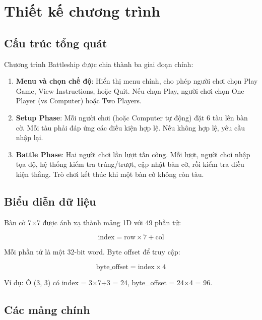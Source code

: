 \section{Thiết kế chương trình}

\subsection{Cấu trúc tổng quát}

Chương trình Battleship được chia thành ba giai đoạn chính:

\begin{enumerate}
    \item \textbf{Menu và chọn chế độ}: Hiển thị menu chính, cho phép người chơi chọn Play Game, View Instructions, hoặc Quit. Nếu chọn Play, người chơi chọn One Player (vs Computer) hoặc Two Players.
    
    \item \textbf{Setup Phase}: Mỗi người chơi (hoặc Computer tự động) đặt 6 tàu lên bàn cờ. Mỗi tàu phải đáp ứng các điều kiện hợp lệ. Nếu không hợp lệ, yêu cầu nhập lại.
    
    \item \textbf{Battle Phase}: Hai người chơi lần lượt tấn công. Mỗi lượt, người chơi nhập tọa độ, hệ thống kiểm tra trúng/trượt, cập nhật bàn cờ, rồi kiểm tra điều kiện thắng. Trò chơi kết thúc khi một bàn cờ không còn tàu.
\end{enumerate}

\subsection{Biểu diễn dữ liệu}

Bàn cờ 7×7 được ánh xạ thành mảng 1D với 49 phần tử:

$$\text{index} = \text{row} \times 7 + \text{col}$$

Mỗi phần tử là một 32-bit word. Byte offset để truy cập:

$$\text{byte\_offset} = \text{index} \times 4$$

Ví dụ: Ô (3, 3) có index = 3×7+3 = 24, byte\_offset = 24×4 = 96.

\subsection{Các mảng chính}

